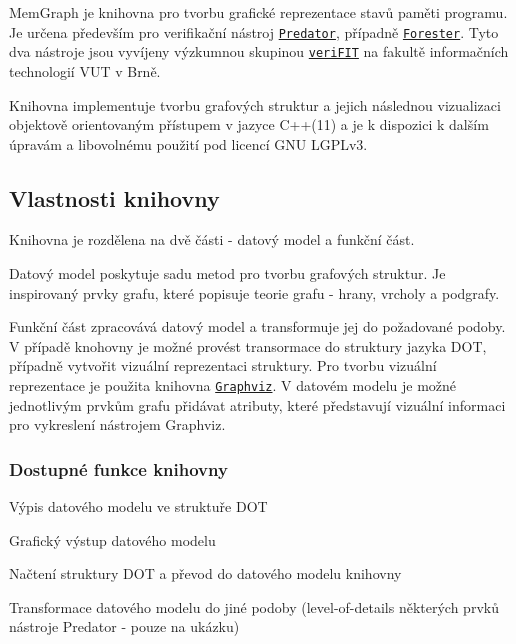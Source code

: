 Mem\+Graph je knihovna pro tvorbu grafické reprezentace stavů paměti programu. Je určena především pro verifikační nástroj \href{http://www.fit.vutbr.cz/research/groups/verifit/tools/predator/}{\tt Predator}, případně \href{http://www.fit.vutbr.cz/research/groups/verifit/tools/forester/}{\tt Forester}. Tyto dva nástroje jsou vyvíjeny výzkumnou skupinou \href{http://www.fit.vutbr.cz/research/groups/verifit/.cs}{\tt veri\+F\+IT} na fakultě informačních technologií V\+UT v Brně.

Knihovna implementuje tvorbu grafových struktur a jejich následnou vizualizaci objektově orientovaným přístupem v jazyce C++(11) a je k dispozici k dalším úpravám a libovolnému použití pod licencí G\+NU L\+G\+P\+Lv3.

\subsection*{Vlastnosti knihovny}

Knihovna je rozdělena na dvě části -\/ datový model a funkční část.

Datový model poskytuje sadu metod pro tvorbu grafových struktur. Je inspirovaný prvky grafu, které popisuje teorie grafu -\/ hrany, vrcholy a podgrafy.

Funkční část zpracovává datový model a transformuje jej do požadované podoby. V případě knohovny je možné provést transormace do struktury jazyka D\+OT, případně vytvořit vizuální reprezentaci struktury. Pro tvorbu vizuální reprezentace je použita knihovna \href{http://www.graphviz.org}{\tt Graphviz}. V datovém modelu je možné jednotlivým prvkům grafu přidávat atributy, které představují vizuální informaci pro vykreslení nástrojem Graphviz.

\subsubsection*{Dostupné funkce knihovny}


\begin{DoxyItemize}
\item Výpis datového modelu ve struktuře D\+OT
\item Grafický výstup datového modelu
\item Načtení struktury D\+OT a převod do datového modelu knihovny
\item Transformace datového modelu do jiné podoby (level-\/of-\/details některých prvků nástroje Predator -\/ pouze na ukázku)
\end{DoxyItemize}

